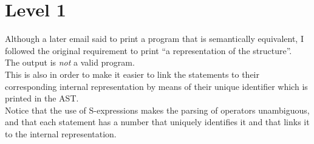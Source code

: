 \section{Level 1}

Although a later email said to print a program that is semantically
equivalent, I followed the original requirement to print ``a representation of
the structure''.\\

The output is \textit{not} a valid program.\\
This is also in order to make it easier to link the statements to their
corresponding internal representation by means of their unique identifier
which is printed in the AST.\\



Notice that the use of S-expressions makes the parsing of operators unambiguous,
and that each statement has a  number that uniquely identifies it
and that links it to the internal representation.
